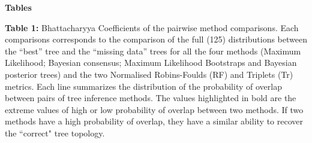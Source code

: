 \documentclass[12pt,letterpaper]{article}
\begin{document}
\newpage
\begin{landscape}

\noindent
\textbf{Tables}\\
\bigskip

\noindent
\textbf{Table 1:} Bhattacharyya Coefficients of the pairwise method comparisons.
Each comparisons corresponds to the comparison of the full (125) distributions between the ``best'' tree and the ``missing data'' trees for all the four methods (Maximum Likelihood; Bayesian consensus; Maximum Likelihood Bootstraps and Bayesian posterior trees) and the two Normalised Robins-Foulds (RF) and Triplets (Tr) metrics. Each line summarizes the distribution of the probability of overlap between pairs of tree inference methods. The values highlighted in bold are the extreme values of high or low probability of overlap between two methods. If two methods have a high probability of overlap, they have a similar ability to recover the ``correct" tree topology.\\


\end{landscape}
\end{document}
